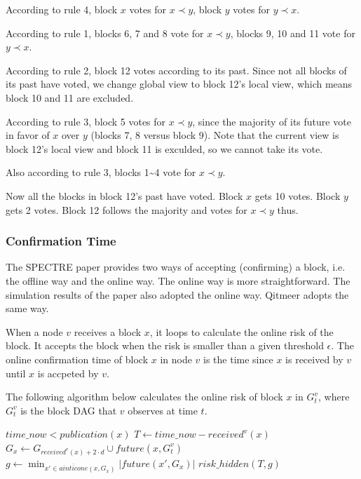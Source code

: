 \documentclass[a4paper,11pt]{article}
\begin{document}
According to rule 4, block $x$ votes for $x \prec y$, block $y$ votes for $y
\prec x$.

According to rule 1, blocks 6, 7 and 8 vote for $x \prec y$, blocks 9, 10 and 11
vote for $y \prec x$.

According to rule 2, block 12 votes according to its past. Since not all blocks
of its past have voted, we change global view to block 12's local view, which
means block 10 and 11 are excluded.

According to rule 3, block 5 votes for $x \prec y$, since the majority of its
future vote in favor of $x$ over $y$ (blocks 7, 8 versus block 9). Note that the
current view is block 12's local view and block 11 is exculded, so we cannot
take its vote.

Also according to rule 3, blocks 1\textasciitilde4 vote for $x \prec y$.

Now all the blocks in block 12's past have voted. Block $x$ gets 10 votes. Block
$y$ gets 2 votes. Block 12 follows the majority and votes for $x \prec y$ thus.


\subsubsection*{Confirmation Time}

The SPECTRE paper provides two ways of accepting (confirming) a block, i.e. the
offline way and the online way. The online way is more straightforward. The
simulation results of the paper also adopted the online way. Qitmeer adopts the same
way.

When a node $v$ receives a block $x$, it loops to calculate the online risk of
the block. It accepts the block when the risk is smaller than a given threshold
$\epsilon$. The online confirmation time of block $x$ in node $v$ is the time
since $x$ is received by $v$ until $x$ is accpeted by $v$.

The following algorithm below calculates the online risk of block $x$ in
$G_t^v$, where $G_t^v$ is the block DAG that $v$ observes at time $t$.

\begin{codebox}
\li \If $time\_now < publication(x)$
\li   \Then
      \End
\li $T \gets time\_now - received^v(x)$
\li $G_x \gets G_{received^v(x) + 2 \cdot d} \cup future(x, G_t^v)$
\li $g \gets \min_{x' \in \overline{ainticone}(x,G_x)} |future(x',G_x)|$
\li \Return $risk\_hidden(T,g)$
\end{codebox}
\end{document}
